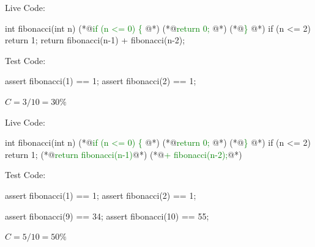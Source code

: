 \documentclass{article}
\begin{document}

\begin{multicols}{2}
Live Code:\par
{\small\begin{ffcode}
int fibonacci(int n) {
  (*@\textcolor{green}{if (n <= 0) \{} @*)
    (*@\textcolor{green}{return 0;} @*)
  (*@\textcolor{green}{\}} @*)
  if (n <= 2) {
    return 1;
  }
  return fibonacci(n-1)
    + fibonacci(n-2);
}
\end{ffcode}
}
\par\columnbreak\par
Test Code:\par
{\small\begin{ffcode}
assert fibonacci(1) == 1;
assert fibonacci(2) == 1;
\end{ffcode}
}
\( C = 3/10 = 30\% \)
\end{multicols}
\plush{}

\begin{multicols}{2}
Live Code:\par
{\small\begin{ffcode}
int fibonacci(int n) {
  (*@\textcolor{green}{if (n <= 0) \{} @*)
    (*@\textcolor{green}{return 0;} @*)
  (*@\textcolor{green}{\}} @*)
  if (n <= 2) {
    return 1;
  }
  (*@\textcolor{green}{return fibonacci(n-1)}@*)
    (*@\textcolor{green}{+ fibonacci(n-2);}@*)
}
\end{ffcode}
}
\par\columnbreak\par
Test Code:\par
{\small\begin{ffcode}
assert fibonacci(1) == 1;
assert fibonacci(2) == 1;

assert fibonacci(9) == 34;
assert fibonacci(10) == 55;
\end{ffcode}
}
\( C = 5/10 = 50\% \)
\end{multicols}
\plush{}

\end{document}

